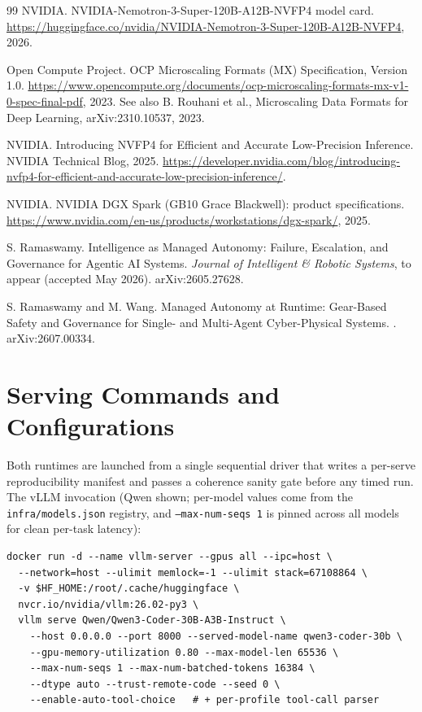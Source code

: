\documentclass[10pt,twocolumn]{article}
\newcommand{\code}[1]{\texttt{\small #1}}
\begin{document}
\begin{thebibliography}{99}
NVIDIA.
\newblock NVIDIA-Nemotron-3-Super-120B-A12B-NVFP4 model card.
\newblock \url{https://huggingface.co/nvidia/NVIDIA-Nemotron-3-Super-120B-A12B-NVFP4}, 2026.

Open Compute Project.
\newblock OCP Microscaling Formats (MX) Specification, Version 1.0.
\newblock \url{https://www.opencompute.org/documents/ocp-microscaling-formats-mx-v1-0-spec-final-pdf}, 2023.
\newblock See also B. Rouhani et al., Microscaling Data Formats for Deep Learning, arXiv:2310.10537, 2023.

NVIDIA.
\newblock Introducing NVFP4 for Efficient and Accurate Low-Precision Inference.
\newblock NVIDIA Technical Blog, 2025.
\newblock \url{https://developer.nvidia.com/blog/introducing-nvfp4-for-efficient-and-accurate-low-precision-inference/}.

NVIDIA.
\newblock NVIDIA DGX Spark (GB10 Grace Blackwell): product specifications.
\newblock \url{https://www.nvidia.com/en-us/products/workstations/dgx-spark/}, 2025.

S. Ramaswamy.
\newblock Intelligence as Managed Autonomy: Failure, Escalation, and Governance for Agentic AI Systems.
\newblock \emph{Journal of Intelligent \& Robotic Systems}, to appear (accepted May 2026). arXiv:2605.27628.

S. Ramaswamy and M. Wang.
\newblock Managed Autonomy at Runtime: Gear-Based Safety and Governance for Single- and Multi-Agent Cyber-Physical Systems.
. arXiv:2607.00334.

\end{thebibliography}

\clearpage
\appendix

\section{Serving Commands and Configurations}
\label{app:serve}

Both runtimes are launched from a single sequential driver that writes a per-serve
reproducibility manifest and passes a coherence sanity gate before any timed run. The vLLM
invocation (Qwen shown; per-model values come from the \code{infra/models.json} registry, and
\code{--max-num-seqs 1} is pinned across all models for clean per-task latency):

\begin{lstlisting}
docker run -d --name vllm-server --gpus all --ipc=host \
  --network=host --ulimit memlock=-1 --ulimit stack=67108864 \
  -v $HF_HOME:/root/.cache/huggingface \
  nvcr.io/nvidia/vllm:26.02-py3 \
  vllm serve Qwen/Qwen3-Coder-30B-A3B-Instruct \
    --host 0.0.0.0 --port 8000 --served-model-name qwen3-coder-30b \
    --gpu-memory-utilization 0.80 --max-model-len 65536 \
    --max-num-seqs 1 --max-num-batched-tokens 16384 \
    --dtype auto --trust-remote-code --seed 0 \
    --enable-auto-tool-choice   # + per-profile tool-call parser
\end{lstlisting}
\end{document}
